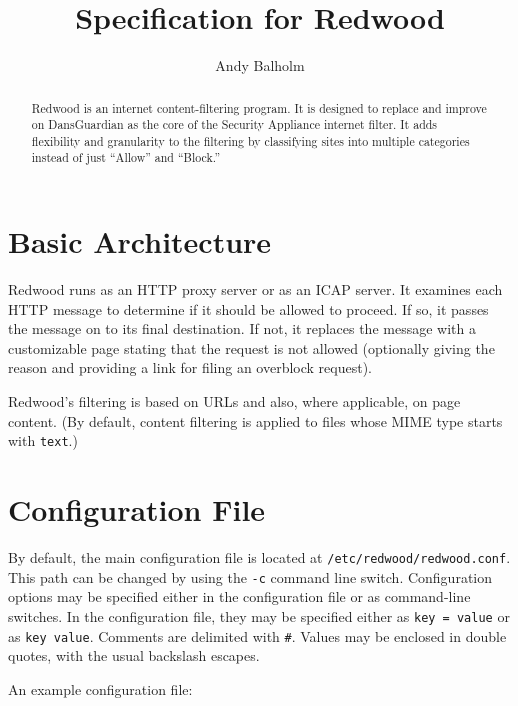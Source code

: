 \documentclass{article}
\title{Specification for Redwood}
\author{Andy Balholm}
\begin{document}
\maketitle

\begin{abstract}

Redwood is an internet content-filtering program. 
It is designed to replace and improve on DansGuardian 
as the core of the Security Appliance internet filter. 
It adds flexibility and granularity to the filtering by classifying sites 
into multiple categories instead of just ``Allow'' and ``Block.'' 

\end{abstract}

\section{Basic Architecture}

Redwood runs as an HTTP proxy server or as an ICAP server.
It examines each HTTP message to determine if it should be allowed to proceed. 
If so, it passes the message on 
to its final destination. If not, it replaces the message with a customizable page 
stating that the request is not allowed (optionally giving the reason 
and providing a link for filing an overblock request).

Redwood's filtering is based on URLs and also, where applicable, on page content. 
(By default, content filtering is applied to files whose MIME type starts with \verb"text".)

\section{Configuration File}

By default, the main configuration file is located at \verb"/etc/redwood/redwood.conf". 
This path can be changed by using the \verb"-c" command line switch. 
Configuration options may be specified either in the configuration file or as command-line
switches. In the configuration file, they may be specified either as
\verb"key = value" or as \verb"key value". Comments are delimited with \verb"#". 
Values may be enclosed in double quotes, with the usual backslash escapes.

An example configuration file:
\end{document}
